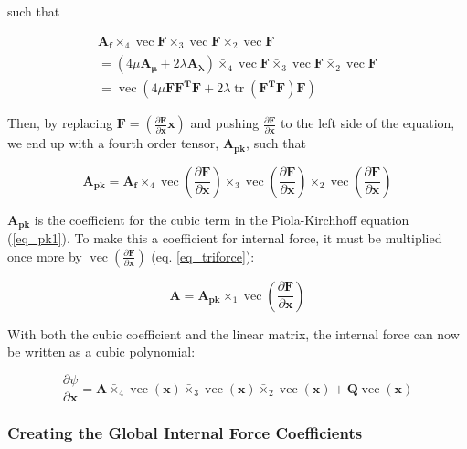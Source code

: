 \documentclass[twocolumn,10pt]{asme2ej}
\DeclareMathOperator{\vect}{vec}
\DeclareMathOperator{\tr}{tr}
\begin{document}
such that

\begin{multline}
    \bm{A_f} \bar{\times}_4 \vect \bm{F} \bar{\times}_3 \vect \bm{F}  \bar{\times}_2 \vect \bm{F}
    \\ = \left( 4\mu\bm{A_{\mu}} + 2\lambda\bm{A_{\lambda}}\right) \bar{\times}_4 \vect \bm{F} \bar{\times}_3 \vect \bm{F} \bar{\times}_2 \vect \bm{F}
    \\ = \vect \left( 4\mu\bm{FF^TF} + 2\lambda\tr\left(\bm{F^TF}\right)\bm{F}\right)
\end{multline}

Then, by replacing $\bm{F} = \left( \frac{\partial \bm{F}}{\partial \bm{x}} \bm{x}\right)$ and pushing $\frac{\partial \bm{F}}{\partial \bm{x}}$ to the left side of the equation, we end up with a fourth order tensor, $\bm{A_{pk}}$, such that

\begin{equation}
\bm{A_{pk}} = \bm{A_f} \times_4 \vect \left(\frac{\partial \bm{F}}{\partial \bm{x}} \right)
\times_3 \vect \left(\frac{\partial \bm{F}}{\partial \bm{x}} \right)
\times_2 \vect \left(\frac{\partial \bm{F}}{\partial \bm{x}} \right)
\end{equation}

$\bm{A_{pk}}$ is the coefficient for the cubic term in the Piola-Kirchhoff equation (\ref{eq_pk1}). To make this a coefficient for internal force, it must be multiplied once more by $\vect \left(\frac{\partial \bm{F}}{\partial \bm{x}} \right)$ (eq. \ref{eq_triforce}):

\begin{equation}
\bm{A} = \bm{A_{pk}} \times_1 \vect \left(\frac{\partial \bm{F}}{\partial \bm{x}} \right)
\label{eq_cubicTerm}
\end{equation}

With both the cubic coefficient and the linear matrix, the internal force can now be written as a cubic polynomial:

\begin{equation}
\frac{\partial \psi}{\partial \bm{x}} = \bm{A} \bar{\times}_4 \vect (\bm{x}) \bar{\times}_3 \vect (\bm{x}) \bar{\times}_2 \vect (\bm{x})+ \bm{Q}\vect (\bm{x})
\label{eq_unreducedCubic}
\end{equation}

\subsubsection{Creating the Global Internal Force Coefficients}
\end{document}
